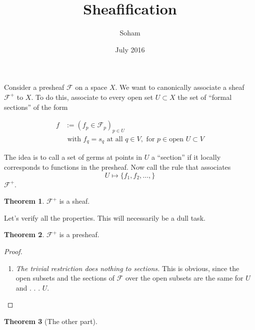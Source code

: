 \documentclass{article}
\title{Sheafification}
\author{Soham}
\date{July 2016}
\newcommand{\sh}[1]{#1^+}
\newcommand{\F}{\mathcal F}
\theoremstyle{definition}
\newtheorem*{thm}{Theorem}
\begin{document}
\maketitle
 
Consider a presheaf $\F$ on a space $X$. We want to canonically associate a
sheaf $\sh\F$ to $X$. To do this, associate to every open set $U\subset X$
the set of ``formal sections'' of the form

\begin{align}
  f &:= (f_p \in \F_p)_{p\in U} \\
    &\text{ with } f_q = s_q \text{ at all } q\in V, \text{ for } p\in \text{open }U\subset V
\end{align}

The idea is to call a set of germs at points in $U$ a ``section''
if it locally corresponds to functions in the presheaf. Now call the rule that associates
$$ U \mapsto \{f_1,f_2,\ldots,\} $$
$\sh\F$.

\begin{thm}
$\sh\F$ is a sheaf.
\end{thm}

Let's verify all the properties. This will necessarily be a dull task.
\begin{thm}
  $\sh\F$ is a presheaf.
\end{thm} 
\begin{proof}
  \begin{enumerate}
  \item\textit{The trivial restriction does nothing to sections.} This is
    obvious, since the open subsets and the sections of $\F$ over the open
    subsets are the same for $U$ and . . . $U$. 
  \end{enumerate}
\end{proof}

\begin{thm}[The other part]
  
\end{thm}
\end{document}
